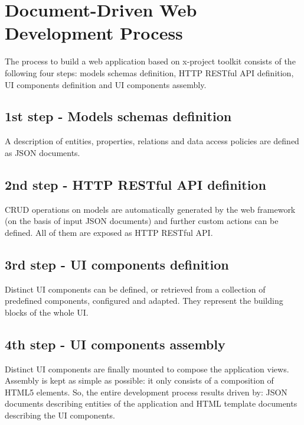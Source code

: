 \section{Document-Driven Web Development Process}
\label{sec:XPR_flow}

The process to build a web application based on x-project toolkit consists of the following four steps: models schemas definition, HTTP RESTful API definition, UI components definition and UI components assembly.

\subsection{1st step - Models schemas definition}
\label{sec:XPR_flow_first}
A description of entities, properties, relations and data access policies are defined as JSON documents.

\subsection{2nd step - HTTP RESTful API definition}
\label{sec:XPR_flow_sec}
CRUD operations on models are automatically generated by the web framework (on the basis of input JSON documents) and further custom actions can be defined. All of them are exposed as HTTP RESTful API.

\subsection{3rd step - UI components definition}
\label{sec:XPR_flow_third}
Distinct UI components can be defined, or retrieved from a collection of predefined components, configured and adapted. They represent the building blocks of the whole UI.

\subsection{4th step - UI components assembly}
\label{sec:XPR_flow_third}
Distinct UI components are finally mounted to compose the application views. Assembly is kept as simple as possible: it only consists of a composition of HTML5 elements.
So, the entire development process results driven by: JSON documents describing entities of the application and HTML template documents describing the UI components.

